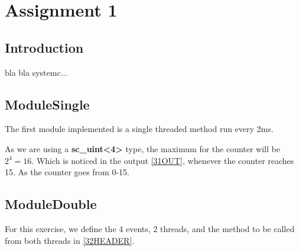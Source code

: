 \documentclass[a4paper,12pt]{report}    %
\begin{document}
\lstset{style=output}

\tableofcontents
\pagestyle{ProjectReport}
\newpage
\lstlistoflistings
\newpage

\chapter{Assignment 1}
\section{Introduction}

bla bla systemc...






\section{ModuleSingle}

The first module implemented is a single threaded method run every 2ms. 

\lstset{style=code}




As we are using a \textbf{sc\_uint<4>} type, the maximum for the counter will be \( 2^4 = 16 \). Which is noticed in the output \ref{31OUT}, whenever the counter reaches 15. As the counter goes from 0-15.

\lstset{style=output}







\section{ModuleDouble}

For this exercise, we define the 4 events, 2 threads, and the method to be called from both threads in \ref{32HEADER}.

\lstset{style=code}

\end{document}
